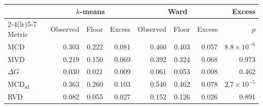 \begin{tabular}{lrrrrrrr}
\toprule
 & \multicolumn{3}{c}{$k$-means} & \multicolumn{3}{c}{Ward} & Excess \\
\cmidrule(lr){2-4}\cmidrule(lr){5-7}
Metric & Observed & Floor & Excess & Observed & Floor & Excess & $p$ \\
\midrule
MCD & 0.303 & 0.222 & 0.081 & 0.460 & 0.403 & 0.057 & $8.8\times10^{-6}$ \\
MVD & 0.219 & 0.150 & 0.069 & 0.392 & 0.324 & 0.068 & 0.973 \\
$\Delta G$ & 0.030 & 0.021 & 0.009 & 0.061 & 0.053 & 0.008 & 0.462 \\
\addlinespace
MCD$_{\mathrm{sd}}$ & 0.363 & 0.260 & 0.103 & 0.540 & 0.462 & 0.078 & $2.7\times10^{-5}$ \\
RVD & 0.082 & 0.055 & 0.027 & 0.152 & 0.126 & 0.026 & 0.891 \\
\bottomrule
\end{tabular}
